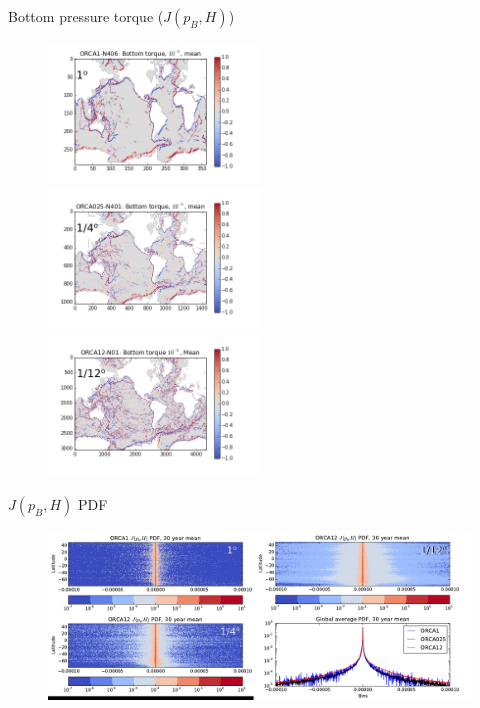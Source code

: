 \documentclass{beamer}
\begin{document}
\begin{frame}{Bottom pressure torque ($J(p_{B}, H)$)}
\begin{center}
\begin{figure}[H]
\centering
\vspace{-0.1cm}
\includegraphics[width=0.5\textwidth]{ORCA1_N406_bottom_torqueMeanP.png}
\includegraphics[width=0.5\textwidth]{ORCA025_N401_bottom_torqueMeanP.png}\\
\vspace{-0.15cm}
\includegraphics[width=0.5\textwidth]{ORCA12_N01_bottom_torque_MeanP.png}
\end{figure}
\end{center}
\end{frame}

\begin{frame}{$J(p_{B}, H)$ PDF}
\begin{center}
\begin{figure}[H]
\centering
\centering \includegraphics[width=1\textwidth]{talkPDFmeanBPT_P.png}
\end{figure}
\end{center}
\end{frame}
\end{document}
